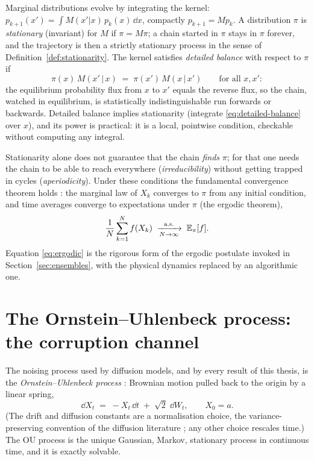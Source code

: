 Marginal distributions evolve by integrating the kernel:
$p_{k+1}(x') = \int M(x'|x)\, p_k(x)\,\dd x$, compactly
$p_{k+1} = M p_k$. A distribution $\pi$ is \emph{stationary} (invariant)
for $M$ if $\pi = M\pi$; a chain started in $\pi$ stays in $\pi$ forever,
and the trajectory is then a strictly stationary process in the sense of
Definition~\ref{def:stationarity}. The kernel satisfies \emph{detailed
balance} with respect to $\pi$ if
\begin{equation}
  \pi(x)\, M(x' \,|\, x) \;=\; \pi(x')\, M(x \,|\, x')
  \qquad \text{for all } x, x' :
  \label{eq:detailed-balance}
\end{equation}
the equilibrium probability flux from $x$ to $x'$ equals the reverse
flux, so the chain, watched in equilibrium, is statistically
indistinguishable run forwards or backwards. Detailed balance implies
stationarity (integrate \eqref{eq:detailed-balance} over $x$), and its
power is practical: it is a local, pointwise condition, checkable without
computing any integral.

Stationarity alone does not guarantee that the chain \emph{finds} $\pi$;
for that one needs the chain to be able to reach everywhere
(\emph{irreducibility}) without getting trapped in cycles
(\emph{aperiodicity}). Under these conditions the fundamental convergence
theorem holds \citep{robert2004monte}: the marginal law of $X_k$
converges to $\pi$ from any initial condition, and time averages converge
to expectations under $\pi$ (the ergodic theorem),
\begin{equation}
  \frac{1}{N} \sum_{k=1}^{N} f(X_k)
  \;\xrightarrow[N \to \infty]{\text{a.s.}}\;
  \mathbb{E}_\pi[f] .
  \label{eq:ergodic}
\end{equation}
Equation \eqref{eq:ergodic} is the rigorous form of the ergodic postulate
invoked in Section~\ref{sec:ensembles}, with the physical dynamics
replaced by an algorithmic one.

\section{The Ornstein--Uhlenbeck process: the corruption channel}
\label{sec:ou}

The noising process used by diffusion models, and by every result of this
thesis, is the \emph{Ornstein--Uhlenbeck process}
\citep{uhlenbeck1930theory}: Brownian motion pulled back to the origin by
a linear spring,
\begin{equation}
  \dd X_t \;=\; -X_t\,\dd t \;+\; \sqrt{2}\;\dd W_t ,
  \qquad X_0 = a .
  \label{eq:ou-sde}
\end{equation}
(The drift and diffusion constants are a normalisation choice, the
variance-preserving convention of the diffusion literature
\citep{song2021scorebased}; any other choice rescales time.) The OU
process is the unique Gaussian, Markov, stationary process in continuous
time, and it is exactly solvable.

